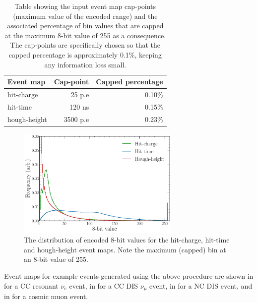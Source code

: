 \begin{table}
    \begin{tabular}{lrr}
        Event map    & Cap-point & Capped percentage \\
        \midrule
        hit-charge   & 25 p.e    & 0.10\%            \\
        hit-time     & 120 ns    & 0.15\%            \\
        hough-height & 3500 p.e  & 0.23\%            \\
    \end{tabular}
    \caption[Table of input event map 8-bit cap-points and percentages]
    {Table showing the input event map cap-points (maximum value of the encoded range) and the
        associated percentage of bin values that are capped at the maximum 8-bit value of 255 as a
        consequence. The cap-points are specifically chosen so that the capped percentage is
        approximately 0.1\%, keeping any information loss small.}
    \label{tab:encoding}
\end{table}

\begin{figure} %
    \includegraphics[width=0.7\textwidth]{diagrams/7-results/explore_8_bit_range.pdf}
    \caption[Event map encoded 8-bit distributions]
    {The distribution of encoded 8-bit values for the hit-charge, hit-time and hough-height event
        maps. Note the maximum (capped) bin at an 8-bit value of 255.}
    \label{fig:explore_8_bit_range}
\end{figure}

Event maps for example events generated using the above procedure are shown in
 for a CC resonant $\nu_{e}$ event, in
 for a CC DIS $\nu_{\mu}$ event, in
 for a NC DIS event, and in
 for a cosmic muon event.

